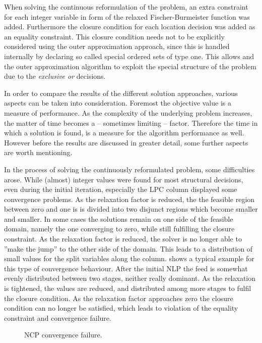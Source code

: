         When solving the continuous reformulation of the problem, an extra constraint for each integer variable in form of the
        relaxed Fischer-Burmeister function was added. Furthermore the closure condition for each location decision was added as
        an equality constraint. This closure condition needs not to be explicitly considered using the outer approximation approach,
        since this is handled internally by declaring so called special ordered sets of type one. This allows \gproms and the
        outer approximation algorithm to exploit the special structure of the problem due to the \emph{exclusive or} decisions.

        In order to compare the results of the different solution approaches, various aspects can be taken into consideration.
        Foremost the objective value is a measure of performance. As the complexity of the underlying problem increases,
        the matter of time becomes a -- sometimes limiting -- factor. Therefore the time in which a solution is found,
        is a measure for the algorithm performance as well. However before the results are discussed in greater detail,
        some further aspects are worth mentioning.

        In the process of solving the continuously reformulated problem, some difficulties arose. While
        (almost) integer values were found for most structural decisions, even during the initial iteration, especially
        the LPC column displayed some convergence problems. As the relaxation factor is reduced, the
        the feasible region between zero and one is is divided into two disjunct regions which become smaller and smaller.
        In some cases the solutions remain on one side of the feasible domain, namely the one converging to zero,
        while still fulfilling the closure constraint. As the relaxation factor is reduced, the solver is no longer able to
        ''make the jump'' to the other side of the domain. This leads to a distribution of small values for the split variables along
        the column.  shows a typical example for this type of convergence behaviour. After the initial NLP the
        feed is somewhat evenly distributed between two stages, neither really dominant. As the relaxation is tightened, the values
        are reduced, and distributed among more stages to fulfil the closure condition. As the relaxation factor approaches zero the
        closure condition can no longer be satisfied, which leads to violation of the equality constraint and convergence failure.
        \begin{figure}
            \scriptsize
            \center
            
            \caption{NCP convergence failure.}
            \label{fig:conv_fail}
        \end{figure}

